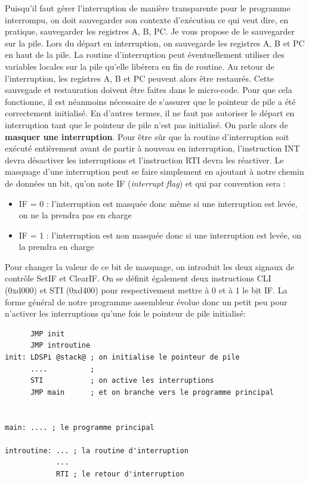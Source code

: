 Puisqu'il faut gérer l'interruption de manière transparente pour le programme interrompu, on doit sauvegarder son contexte d'exécution ce qui veut dire, en pratique, sauvegarder les registres A, B, PC. Je vous propose de le sauvegarder sur la pile. Lors du départ en interruption, on sauvegarde les registres A, B et PC en haut de la pile. La routine d'interruption peut éventuellement utiliser des variables locales sur la pile qu'elle libérera en fin de routine. Au retour de l'interruption, les registres A, B et PC peuvent alors être restaurés. Cette sauvegade et restauration doivent être faites dans le micro-code. Pour que cela fonctionne, il est néanmoins nécessaire de s'assurer que le pointeur de pile a été correctement initialisé. En d'autres termes, il ne faut pas autoriser le départ en interruption tant que le pointeur de pile n'est pas initialisé. On parle alors de \textbf{masquer une interruption}. Pour être sûr que la routine d'interruption soit exécuté entièrement avant de partir à nouveau en interruption, l'instruction INT devra désactiver les interruptions et l'instruction RTI devra les réactiver. Le masquage d'une interruption peut se faire simplement en ajoutant à notre chemin de données un bit, qu'on note IF (\emph{interrupt flag}) et qui par convention sera :
\begin{itemize}
\item IF = 0  : l'interruption est masquée donc même si une interruption est levée, on ne la prendra pas en charge 
\item IF = 1 : l'interruption est non masquée donc si une interruption est levée, on la prendra en charge
\end{itemize}

Pour changer la valeur de ce bit de masquage, on introduit les deux signaux de contrôle SetIF et ClearIF. On se définit également deux instructions CLI (0xd000) et STI (0xd400) pour respectivement mettre à 0 et à 1 le bit IF. La forme général de notre programme assembleur évolue donc un petit peu pour n'activer les interruptions qu'une fois le pointeur de pile initialisé:
\begin{verbatim}
      JMP init
      JMP introutine
init: LDSPi @stack@ ; on initialise le pointeur de pile
      ....          ;
      STI           ; on active les interruptions
      JMP main      ; et on branche vers le programme principal


main: .... ; le programme principal

introutine: ... ; la routine d'interruption
            ...
            RTI ; le retour d'interruption
\end{verbatim}


